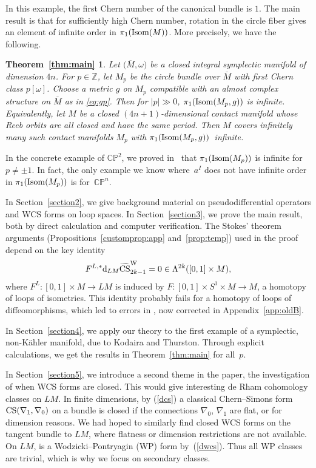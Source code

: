 \documentclass[10pt,a4paper]{amsart}
\numberwithin{equation}{section}
\newtheorem*{TheoremMain}{Theorem~\ref{thm:main}}
\theoremstyle{definition}
\newcommand{\BbP}{{\mathbb P}}
\newcommand{\BbC}{{\mathbb C}}
\newcommand{\BbZ}{{\mathbb Z}}
\newcommand{\Z}{\BbZ}
\newcommand{\bm}{ M}
\newcommand{\ocs}{\widetilde{{\rm CS}}}
\newcommand{\om}{\overline{M}}
\newcommand{\omp}{M_p}
\newcommand{\isom}{{\rm Isom}}
\newcommand{\isombm}{\isom(\bm)}
\begin{document}
In this example, the first Chern number of the canonical bundle is $1$.
The main result is that for sufficiently high Chern number, rotation in the circle fiber gives an element of infinite order in $\pi_1(\isombm)$. More precisely, we have the following.

\begin{TheoremMain}
Let $\bigl(\om,\omega\bigr)$ be a closed integral symplectic manifold of dimension $4n$. For $p\in \Z$, let $\omp$ be the circle bundle over $\om$ with first Chern class $p[\omega]$. Choose a metric $g$ on $\omp$ compatible with an almost complex structure on $\om$ as in \eqref{eq:gp}. Then for $|p| \gg 0 $,
 $\pi_1(\isom(\omp,g))$ is
infinite. Equivalently, let $M$ be a closed $(4n+1)$-dimensional contact manifold whose Reeb orbits are all closed and have the same period. Then $M$ covers infinitely many such contact manifolds $\omp$ with
$\pi_1({\rm Isom}(\omp,g))$~infinite.
\end{TheoremMain}

In the concrete example of $\BbC\BbP^{2}$, we proved in~\cite{MRT4} that $\pi_1(\isom(\omp))$ is infinite for
$p\neq \pm1$. In fact, the only example we know where~$a^I$ does not have infinite order in $\pi_1({\rm Isom}(\omp))$ is for~$\BbC\BbP^{n}$.

In Section~\ref{section2}, we give background material on pseudodifferential operators and WCS forms on
loop spaces. In Section~\ref{section3}, we prove the main result, both by direct calculation and computer verification.
The Stokes' theorem arguments (Propositions~\ref{customprop:app} and~\ref{prop:temp}) used in the proof depend on the key identity
\begin{equation} \label{eq:intro}
F^{L,*}{\rm d}_{LM}\ocs^{\rm W}_{2k-1} = 0\in \Lambda^{2k}([0,1]\times M),
\end{equation}
where $F^L\colon [0,1] \times M \to LM$ is induced by $F\colon [0,1]\times S^1\times M\to M$, a homotopy of loops of isometries. This identity probably fails for a homotopy of loops of diffeomorphisms, which led to errors in \cite{MRT4}, now corrected in Appendix~\ref{app:oldB}.

In Section~\ref{section4}, we apply our theory to the first example of a symplectic, non-K\"ahler manifold, due to Kodaira and Thurston. Through explicit calculations, we get the results in Theorem~\ref{thm:main} for all~$p$.

In Section~\ref{section5},
we introduce a second theme in the paper, the investigation of when WCS forms are closed. This would give interesting de Rham cohomology classes on $LM$. In finite dimensions, by (\ref{dcs}) a classical Chern--Simons form ${\rm CS}(\nabla_1, \nabla_0)$ on a bundle is closed if the connections $\nabla_0$, $\nabla_1$ are flat, or for dimension reasons. We had hoped to similarly find closed WCS forms on the tangent bundle to $LM$, where flatness or dimension restrictions are not available.
 On $LM$, \smash{$ {\rm d}_{LM}\ocs{}^{\rm W}_{2k-1}$} is a Wodzicki--Pontryagin (WP) form by~(\ref{dwcs}). Thus all WP
 classes are trivial, which is why we focus on secondary classes.
\end{document}
